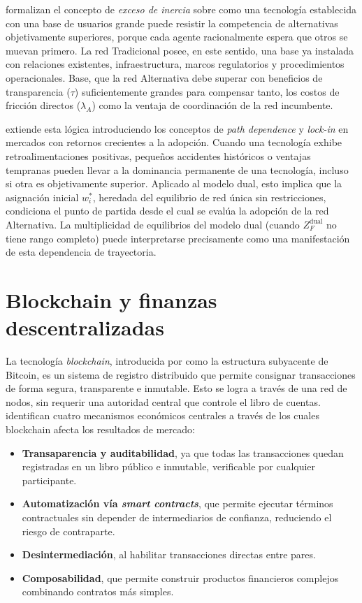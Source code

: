  formalizan el concepto de \textit{exceso de
inercia} sobre como una tecnología establecida con una base
de usuarios grande puede resistir la competencia de alternativas objetivamente
superiores, porque cada agente racionalmente espera que otros se muevan
primero. La red Tradicional posee, en este sentido, una base ya instalada con relaciones existentes, infraestructura, marcos regulatorios y procedimientos operacionales. 
Base, que la red Alternativa debe superar con beneficios de transparencia ($\tau$) suficientemente grandes para compensar tanto, los costos de fricción directos ($\lambda_A$) como la ventaja de coordinación de la red incumbente.

 extiende esta lógica introduciendo los conceptos
de \textit{path dependence} y \textit{lock-in} en mercados con retornos
crecientes a la adopción. Cuando una tecnología exhibe retroalimentaciones
positivas, pequeños accidentes históricos o ventajas tempranas pueden llevar a
la dominancia permanente de una tecnología, incluso si otra es objetivamente
superior. Aplicado al modelo dual, esto implica que la asignación inicial
$w_i^*$, heredada del equilibrio de red única sin restricciones, condiciona el
punto de partida desde el cual se evalúa la adopción de la red Alternativa. La
multiplicidad de equilibrios del modelo dual (cuando $Z_F^{\text{dual}}$ no
tiene rango completo) puede interpretarse precisamente como una manifestación de
esta dependencia de trayectoria.

\section{Blockchain y finanzas descentralizadas}

La tecnología \textit{blockchain}, introducida por 
como la estructura subyacente de Bitcoin, es un sistema de registro
distribuido que permite consignar transacciones de forma segura, transparente e
inmutable. Esto se logra a través de una red de nodos, sin requerir una autoridad central que
controle el libro de cuentas.  identifican cuatro
mecanismos económicos centrales a través de los cuales blockchain afecta los
resultados de mercado:

\begin{itemize}
    \item \textbf{Transaparencia y auditabilidad}, ya que todas las transacciones quedan registradas en un libro público e inmutable, verificable por cualquier participante.
    \item \textbf{Automatización vía \textit{smart contracts}}, que permite ejecutar términos contractuales sin depender de intermediarios de confianza, reduciendo el riesgo de contraparte.
    \item \textbf{Desintermediación}, al habilitar transacciones directas entre pares.
    \item \textbf{Composabilidad}, que permite construir productos financieros complejos combinando contratos más simples.
\end{itemize}

